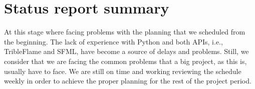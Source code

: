 \documentclass[12pt,a4paper]{article}
\begin{document}
\section{Status report summary}

At this stage where facing problems with the planning that we scheduled from the beginning. The lack of experience with Python and both APIs, i.e., TribleFlame and SFML, have become a source of delays and problems. Still, we consider that we are facing the common problems that a big project, as this is, usually have to face. We are still on time and working reviewing the schedule weekly in order to achieve the proper planning for the rest of the project period.
\end{document}

